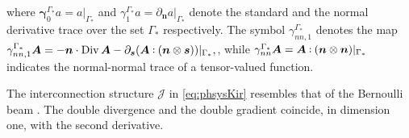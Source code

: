 where $\bm\gamma_{0}^{\Gamma_*}a = a\vert_{\Gamma_*}$ and  $\gamma_{1}^{\Gamma_*}a = \partial_{\bm{n}} a \vert_{\Gamma_*}$ denote the standard and the normal derivative trace over the set $\Gamma_*$ respectively. The symbol $\gamma_{nn, 1}^{\Gamma_*}$ denotes the map $\gamma_{nn, 1}^{\Gamma_*}\bm{A} = -\bm{n} \cdot \Div \bm{A} - \partial_{\bm{s}} (\bm{A} \cddot (\bm{n} \otimes \bm{s}))\vert_{\Gamma_*},$, while $\gamma_{nn}^{\Gamma_*}\bm{A} = \bm{A} \cddot (\bm{n} \otimes \bm{n})\vert_{\Gamma_*}$ indicates the normal-normal trace of a tensor-valued function.

\begin{remark}
	The interconnection structure $\mathcal{J}$ in \eqref{eq:phsysKir} resembles that of the Bernoulli beam \cite{cardoso2017}. The double divergence and the double gradient coincide, in dimension one, with the second derivative.
\end{remark}

